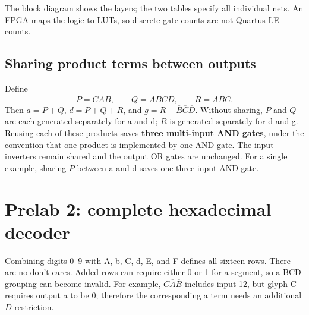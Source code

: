 \documentclass[a4paper,11pt]{article}
\begin{document}
The block diagram shows the layers; the two tables specify all individual nets. An FPGA maps the logic to LUTs, so discrete gate counts are not Quartus LE counts.

\subsection{Sharing product terms between outputs}
Define
\[
P=C\overline A\overline B,\qquad Q=A\overline B\overline C\overline D,\qquad R=ABC.
\]
Then $a=P+Q$, $d=P+Q+R$, and $g=R+\overline B\overline C\overline D$.
Without sharing, $P$ and $Q$ are each generated separately for a and d; $R$ is generated
separately for d and g. Reusing each of these products saves \textbf{three multi-input
AND gates}, under the convention that one product is implemented by one AND gate.
The input inverters remain shared and the output OR gates are unchanged. For a single
example, sharing $P$ between a and d saves one three-input AND gate.

\clearpage\section{Prelab 2: complete hexadecimal decoder}
Combining digits 0--9 with A, b, C, d, E, and F defines all sixteen rows. There are no
don't-cares. Added rows can require either 0 or 1 for a segment, so a BCD grouping can
become invalid. For example, $C\overline A\overline B$ includes input 12, but glyph C
requires output a to be 0; therefore the corresponding a term needs an additional
$\overline D$ restriction.
\end{document}
